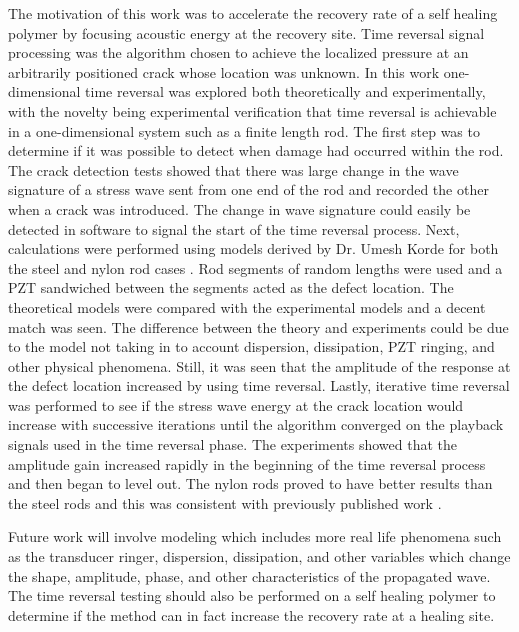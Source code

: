 
The motivation of this work was to accelerate the recovery rate of a self healing polymer by focusing acoustic energy at the recovery site. Time reversal signal processing was the algorithm chosen to achieve the localized pressure at an arbitrarily positioned crack whose location was unknown. In this work one-dimensional time reversal was explored both theoretically and experimentally, with the novelty being experimental verification that time reversal is achievable in a one-dimensional system such as a finite length rod. The first step was to determine if it was possible to detect when damage had occurred within the rod. The crack detection tests showed that there was large change in the wave signature of a stress wave sent from one end of the rod and recorded the other when a crack was introduced. The change in wave signature could easily be detected in software to signal the start of the time reversal process. Next, calculations were performed using models derived by Dr. Umesh Korde for both the steel and nylon rod cases \cite{Fehrman2012}. Rod segments of random lengths were used and a PZT sandwiched between the segments acted as the defect location. The theoretical models were compared with the experimental models and a decent match was seen. The difference between the theory and experiments could be due to the model not taking in to account dispersion, dissipation, PZT ringing, and other physical phenomena. Still, it was seen that the amplitude of the response at the defect location increased by using time reversal. Lastly, iterative time reversal was performed to see if the stress wave energy at the crack location would increase with successive iterations until the algorithm converged on the playback signals used in the time reversal phase. The experiments showed that the amplitude gain increased rapidly in the beginning of the time reversal process and then began to level out. The nylon rods proved to have better results than the steel rods and this was consistent with previously published work \cite{Fink1993}. 

Future work will involve modeling which includes more real life phenomena such as the transducer ringer, dispersion, dissipation, and other variables which change the shape, amplitude, phase, and other characteristics of the propagated wave. The time reversal testing should also be performed on a self healing polymer to determine if the method can in fact increase the recovery rate at a healing site.
